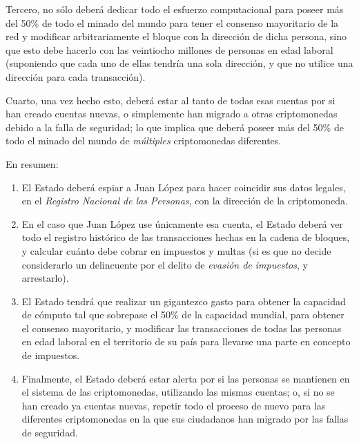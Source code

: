 \documentclass[12pt,a4paper,twoside]{book}
\begin{document}
Tercero, no sólo deberá dedicar todo el esfuerzo computacional para poseer más del 50\% de todo el minado del mundo para tener el consenso mayoritario de la red y modificar arbitrariamente el bloque con la dirección de dicha persona, sino que esto debe hacerlo con las veintiocho millones de personas en edad laboral (suponiendo que cada uno de ellas tendría una sola dirección, y que no utilice una dirección para cada transacción).

Cuarto, una vez hecho esto, deberá estar al tanto de todas esas cuentas por si han creado cuentas nuevas, o simplemente han migrado a otras criptomonedas debido a la falla de seguridad; lo que implica que deberá poseer más del 50\% de todo el minado del mundo de \textit{múltiples} criptomonedas diferentes.

En resumen:

\begin{enumerate}
\item El Estado deberá espiar a Juan López para hacer coincidir sus datos legales, en el \textit{Registro Nacional de las Personas}, con la dirección de la criptomoneda.
\item En el caso que Juan López use únicamente esa cuenta, el Estado deberá ver todo el registro histórico de las transacciones hechas en la cadena de bloques, y calcular cuánto debe cobrar en impuestos y multas (si es que no decide considerarlo un delincuente por el delito de \textit{evasión de impuestos}, y arrestarlo).
\item El Estado tendrá que realizar un gigantezco gasto para obtener la capacidad de cómputo tal que sobrepase el 50\% de la capacidad mundial, para obtener el consenso mayoritario, y modificar las transacciones de todas las personas en edad laboral en el territorio de su país para llevarse una parte en concepto de impuestos.
\item Finalmente, el Estado deberá estar alerta por si las personas se mantienen en el sistema de las criptomonedas, utilizando las mismas cuentas; o, si no se han creado ya cuentas nuevas, repetir todo el proceso de nuevo para las diferentes criptomonedas en la que sus ciudadanos han migrado por las fallas de seguridad.
\end{enumerate}
\end{document}
